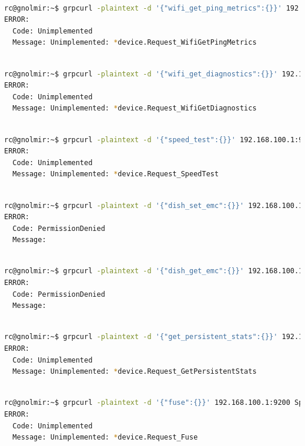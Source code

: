 \documentclass[IN,11pt,twoside,openright,idp,english]{tumthesis}
\begin{document}
\begin{lstlisting}[language=bash,basicstyle=\tiny]

rc@gnolmir:~$ grpcurl -plaintext -d '{"wifi_get_ping_metrics":{}}' 192.168.100.1:9200 SpaceX.API.Device.Device/Handle
ERROR:
  Code: Unimplemented
  Message: Unimplemented: *device.Request_WifiGetPingMetrics
  \end{lstlisting}
\begin{lstlisting}[language=bash,basicstyle=\tiny]

rc@gnolmir:~$ grpcurl -plaintext -d '{"wifi_get_diagnostics":{}}' 192.168.100.1:9200 SpaceX.API.Device.Device/Handle
ERROR:
  Code: Unimplemented
  Message: Unimplemented: *device.Request_WifiGetDiagnostics
  \end{lstlisting}
\begin{lstlisting}[language=bash,basicstyle=\tiny]

rc@gnolmir:~$ grpcurl -plaintext -d '{"speed_test":{}}' 192.168.100.1:9200 SpaceX.API.Device.Device/Handle
ERROR:
  Code: Unimplemented
  Message: Unimplemented: *device.Request_SpeedTest
 \end{lstlisting}
\begin{lstlisting}[language=bash,basicstyle=\tiny]

rc@gnolmir:~$ grpcurl -plaintext -d '{"dish_set_emc":{}}' 192.168.100.1:9200 SpaceX.API.Device.Device/Handle
ERROR:
  Code: PermissionDenied
  Message: 
  \end{lstlisting}
\begin{lstlisting}[language=bash,basicstyle=\tiny]

rc@gnolmir:~$ grpcurl -plaintext -d '{"dish_get_emc":{}}' 192.168.100.1:9200 SpaceX.API.Device.Device/Handle
ERROR:
  Code: PermissionDenied
  Message: 
  \end{lstlisting}
\begin{lstlisting}[language=bash,basicstyle=\tiny]

rc@gnolmir:~$ grpcurl -plaintext -d '{"get_persistent_stats":{}}' 192.168.100.1:9200 SpaceX.API.Device.Device/Handle
ERROR:
  Code: Unimplemented
  Message: Unimplemented: *device.Request_GetPersistentStats
\end{lstlisting}
\begin{lstlisting}[language=bash,basicstyle=\tiny]

rc@gnolmir:~$ grpcurl -plaintext -d '{"fuse":{}}' 192.168.100.1:9200 SpaceX.API.Device.Device/Handle
ERROR:
  Code: Unimplemented
  Message: Unimplemented: *device.Request_Fuse
 \end{lstlisting}
\end{document}
